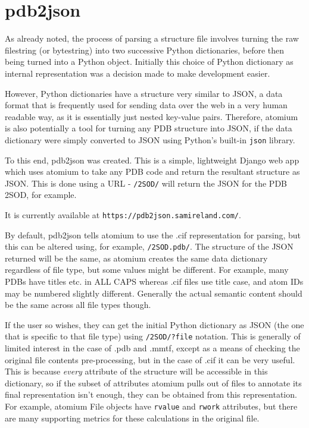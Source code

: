 \section{pdb2json}

As already noted, the process of parsing a structure file involves turning the raw filestring (or bytestring) into two successive Python dictionaries, before then being turned into a Python object. Initially this choice of Python dictionary as internal representation was a decision made to make development easier.

However, Python dictionaries have a structure very similar to JSON, a data format that is frequently used for sending data over the web in a very human readable way, as it is essentially just nested key-value pairs. Therefore, atomium is also potentially a tool for turning any PDB structure into JSON, if the data dictionary were simply converted to JSON using Python's built-in \texttt{json} library.

To this end, pdb2json was created. This is a simple, lightweight Django web app which uses atomium to take any PDB code and return the resultant structure as JSON. This is done using a URL - \texttt{/2SOD/} will return the JSON for the PDB 2SOD, for example.

It is currently available at \texttt{https://pdb2json.samireland.com/}.

By default, pdb2json tells atomium to use the .cif representation for parsing, but this can be altered using, for example, \texttt{/2SOD.pdb/}. The structure of the JSON returned will be the same, as atomium creates the same data dictionary regardless of file type, but some values might be different. For example, many PDBs have titles etc. in ALL CAPS whereas .cif files use title case, and atom IDs may be numbered slightly different. Generally the actual semantic content should be the same across all file types though.

If the user so wishes, they can get the initial Python dictionary as JSON (the one that is specific to that file type) using \texttt{/2SOD/?file} notation. This is generally of limited interest in the case of .pdb and .mmtf, except as a means of checking the original file contents pre-processing, but in the case of .cif it can be very useful. This is because \emph{every} attribute of the structure will be accessible in this dictionary, so if the subset of attributes atomium pulls out of files to annotate its final representation isn't enough, they can be obtained from this representation. For example, atomium File objects have \texttt{rvalue} and \texttt{rwork} attributes, but there are many supporting metrics for these calculations in the original file.

